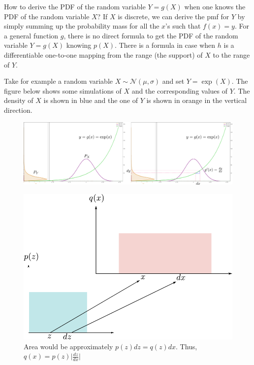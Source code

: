 How to derive the PDF of the random variable $Y=g(X)$ when one knows the PDF of the random variable $X$? If $X$ is discrete, we can derive the pmf for $Y$ by simply summing up the probability mass for all the $x$'s such that $f(x)=y$. For a general function $g$, there is no direct formula to get the PDF of the random variable $Y=g(X)$ knowing $p(X)$. There is a formula in case when $h$ is a differentiable one-to-one mapping from the range (\ie the support) of $X$ to the range of $Y$.

Take for example a random variable $X\sim \mathcal{N}(\mu, \sigma)$ and set $Y=\exp(X)$. The figure below shows some simulations of $X$ and the corresponding values of $Y$. The density of $X$ is shown in blue and the one of $Y$ is shown in orange in the vertical direction.

\begin{figure}[t]
	\centering
	\includegraphics[scale=0.23]{./images/generative/flows/change_of_vars.pdf}
\end{figure}

\begin{figure}[t]
    \centering
    \includegraphics[scale=0.7]{./images/generative/flows/change_intuition.pdf}
    \caption{Area would be approximately $p(z)dz = q(z)dx$. Thus, $q(x) = p(z)\Big|\frac{dz}{dx}\Big|$}
    \label{fig:change_intuition}
\end{figure}


